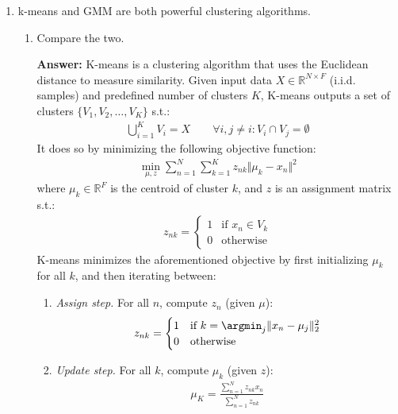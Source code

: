 \documentclass{article}
\newenvironment{QandA}{\begin{enumerate}[label=\arabic*.]}{\end{enumerate}}
\newenvironment{InnerQandA}{\begin{enumerate}[label=\roman*.]}{\end{enumerate}}
\newenvironment{answer}{\par\normalfont \textbf{Answer:}}{}
\newcommand{\R}{\mathbb{R}}
\begin{document}
\begin{QandA}
    \item k-means and GMM are both powerful clustering algorithms.
    \begin{InnerQandA}
        \item Compare the two.
        \begin{answer}
            K-means is a clustering algorithm that uses the Euclidean distance to measure similarity. Given input data $X \in \R^{N \times F}$ (i.i.d. samples) and predefined number of clusters $K$, K-means outputs a set of clusters $\{V_1, V_2, \ldots, V_K\}$ s.t.:
            \begin{align*}
                \bigcup_{i=1}^K V_i = X \quad\quad \forall i, j\neq i:  V_i \cap V_j = \emptyset
            \end{align*}
            It does so by minimizing the following objective function:
            \begin{align*}
                \min_{\mu, z} \sum_{n=1}^N \sum_{k=1}^K z_{nk} \Vert \mu_k - x_n \Vert^2
            \end{align*}
            where $\mu_k \in \R^{F}$ is the centroid of cluster $k$, and $z$ is an assignment matrix s.t.:
            \begin{align*}
                z_{nk} = \begin{cases}
                    1 & \text{if } x_n \in V_k \\
                    0 & \text{otherwise}
                \end{cases}
            \end{align*}
            K-means minimizes the aforementioned objective by first initializing $\mu_k$ for all $k$, and then iterating between:
            \begin{enumerate}[label=\arabic*.]
            \item \textit{Assign step.} For all $n$, compute $z_{n}$ (given $\mu$):
            \begin{align*}
                z_{nk} = \begin{cases}
                    1 &\text{if } k = \argmin_{j} \Vert x_n - \mu_j \Vert^2_2 \\
                    0 &\text{otherwise}
                \end{cases}
            \end{align*}
            \item \textit{Update step.} For all $k$, compute $\mu_k$ (given $z$):
            \begin{align*}
                \mu_K = \frac{\sum_{n=1}^N z_{nk} x_n}{\sum_{n=1}^N z_{nk}}

\end{align*}
\end{enumerate}
\end{answer}
\end{InnerQandA}
\end{QandA}
\end{document}
